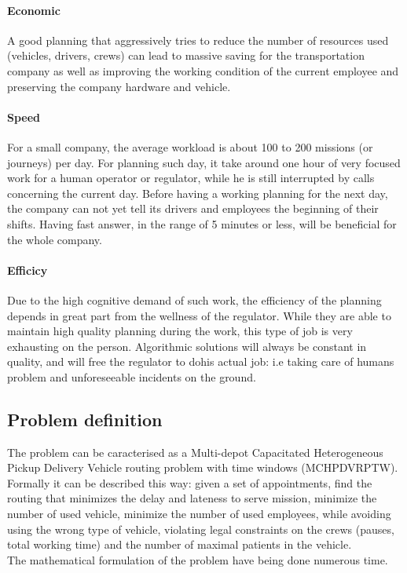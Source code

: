 \documentclass[12pt]{memoir}
\begin{document}
\paragraph{Economic} %
\label{par:Economic}
A good planning that aggressively tries to reduce the number of resources used
(vehicles, drivers, crews) can lead to massive saving for the transportation company
as well as improving the working condition of the current employee and preserving
the company hardware and vehicle.
\paragraph{Speed} %
\label{par:Speed}
For a small company, the average workload is about 100 to 200 missions (or journeys)
per day. For planning such day, it take around one hour of very focused work for a human
operator or regulator, while he is still interrupted by calls concerning the current
day. Before having a working planning for the next day, the company can not yet
tell its drivers and employees the beginning of their shifts. Having fast answer,
in the range of 5 minutes or less, will be beneficial for the whole company.
\paragraph{Efficicy} %
\label{par:Efficicy}
Due to the high cognitive demand of such work, the efficiency of the planning depends
in great part from the wellness of the regulator. While they are able to maintain
high quality planning during the work, this type of job is very exhausting on
the person. Algorithmic solutions will always be constant in quality, and will
free the regulator to dohis actual job: i.e taking care of humans problem and
unforeseeable incidents on the ground.


\subsection{Problem definition}
The problem can be caracterised as a Multi-depot Capacitated Heterogeneous Pickup
Delivery Vehicle routing problem with time windows (MCHPDVRPTW). \\
Formally it can be described this way: given a set of appointments, find the routing that minimizes the
delay and lateness to serve mission, minimize the number of used vehicle, minimize
the number of used employees, while avoiding using the wrong type of vehicle,
violating legal constraints on the crews (pauses, total working time) and the number
of maximal patients in the vehicle.\\
The mathematical formulation of the problem have being done numerous
time\cite{desaulniers2000vrp}.
\end{document}

